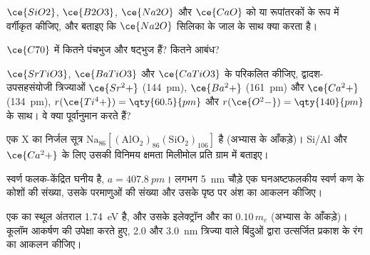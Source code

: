 \begin{exercise}[$\star$]\label{exo:b3:inorganic-materials:3}
$\ce{SiO2}$, $\ce{B2O3}$, $\ce{Na2O}$ और $\ce{CaO}$ को  या रूपांतरकों के रूप में वर्गीकृत कीजिए, और बताइए कि
$\ce{Na2O}$ सिलिका के जाल के साथ क्या करता है।
\end{exercise}

\begin{exercise}[$\star$]\label{exo:b3:inorganic-materials:4}
$\ce{C70}$ में कितने पंचभुज और षट्भुज हैं? कितने आबंध?
\end{exercise}

\begin{exercise}[$\star\star$]\label{exo:b3:inorganic-materials:5}
$\ce{SrTiO3}$, $\ce{BaTiO3}$ और $\ce{CaTiO3}$ के  परिकलित कीजिए, द्वादश-उपसहसंयोजी त्रिज्याओं
$\ce{Sr^2+}$ (\qty{144}{pm}), $\ce{Ba^2+}$ (\qty{161}{pm}) और $\ce{Ca^2+}$ (\qty{134}{pm}), $r(\ce{Ti^4+}) = \qty{60.5}{pm}$ और $r(\ce{O^2-}) = \qty{140}{pm}$ के साथ। वे
क्या पूर्वानुमान करते हैं?
\end{exercise}

\begin{exercise}[$\star\star$]\label{exo:b3:inorganic-materials:6}
एक  X का निर्जल सूत्र $\mathrm{Na_{86}[(AlO_2)_{86}(SiO_2)_{106}]}$ है (अभ्यास के आँकड़े)।
Si/Al और $\ce{Ca^2+}$ के लिए उसकी विनिमय क्षमता मिलीमोल प्रति ग्राम में बताइए।
\end{exercise}

\begin{exercise}[$\star\star$]\label{exo:b3:inorganic-materials:7}
स्वर्ण फलक-केंद्रित घनीय है, $a = \qty{407.8}{pm}$। लगभग \qty{5}{nm} चौड़े एक
घनअष्टफलकीय स्वर्ण कण के कोशों की संख्या, उसके परमाणुओं की संख्या और
उसके पृष्ठ पर अंश का आकलन कीजिए।
\end{exercise}

\begin{exercise}[$\star\star$]\label{exo:b3:inorganic-materials:8}
एक  का स्थूल अंतराल \qty{1.74}{eV} है, और उसके इलेक्ट्रॉन और  का  $0.10\,m_e$ (अभ्यास के आँकड़े)। कूलॉम आकर्षण की उपेक्षा करते हुए, 2.0 और \qty{3.0}{nm} त्रिज्या वाले
बिंदुओं द्वारा उत्सर्जित प्रकाश के रंग का आकलन कीजिए।
\end{exercise}

